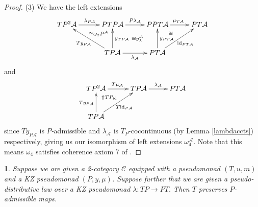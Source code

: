 \documentclass[a4paper,oneside,english]{amsart}
\numberwithin{equation}{section}
\numberwithin{figure}{section}
\theoremstyle{plain}
\theoremstyle{definition}
\theoremstyle{remark}
\theoremstyle{definition}
\theoremstyle{plain}
\newtheorem{prop}[thm]{\protect\propositionname}
\theoremstyle{plain}
\theoremstyle{plain}
\providecommand{\propositionname}{Proposition}
\begin{document}
\begin{proof}
(3) We have the left extensions
\[
\xymatrix@=1em{TP^{2}\mathcal{A}\ar[rr]^{\lambda_{P\mathcal{A}}} &  & PTP\mathcal{A}\ar[rr]^{P\lambda_{\mathcal{A}}}\ar@{}[rddr]|-{\quad\cong y_{\lambda}^{\mathcal{A}}} &  & PPT\mathcal{A}\ar[rr]^{\mu_{T\mathcal{A}}} &  & PT\mathcal{A}\\
 & \;\ar@{}[ur]|-{\cong\omega_{2}P^{\mathcal{A}}} &  &  &  & \ar@{}[ul]|-{\cong}\\
 &  & TP\mathcal{A}\ar[uu]_{y_{TP\mathcal{A}}}\ar[uull]^{Ty_{P\mathcal{A}}}\ar[rr]_{\lambda_{\mathcal{A}}} &  & PT\mathcal{A}\ar[uu]_{y_{PT\mathcal{A}}}\ar[rruu]_{\textnormal{id}_{PT\mathcal{A}}}
}
\]
and
\[
\xymatrix@=1em{TP^{2}\mathcal{A}\ar[rr]^{T\mu_{\mathcal{A}}} &  & TP\mathcal{A}\ar[rr]^{\lambda_{\mathcal{A}}} &  & PT\mathcal{A}\\
 & \;\ar@{}[ul]|-{\Uparrow TP_{\textnormal{id}}}\\
TP\mathcal{A}\ar[rruu]_{T\textnormal{id}_{P\mathcal{A}}}\ar[uu]^{Ty_{P\mathcal{A}}}
}
\]
since $Ty_{P\mathcal{A}}$ is \emph{$P$-}admissible and $\lambda_{\mathcal{A}}$
is $T_{P}$-cocontinuous (by Lemma \ref{lambdaccts}) respectively,
giving us our isomorphism of left extensions $\omega_{4}^{\mathcal{A}}$.
Note that this means $\omega_{4}$ satisfies coherence axiom 7 of
\cite{marm1999}.\end{proof}
\begin{prop}
\label{preserveadm} Suppose we are given a 2-category $\mathscr{C}$
equipped with a pseudomonad $\left(T,u,m\right)$ and a KZ pseudomonad
$\left(P,y,\mu\right)$. Suppose further that we are given a pseudo-distributive
law over a KZ pseudomonad $\lambda\colon TP\to PT$. Then $T$ preserves
$P$-admissible maps.\end{prop}
\end{document}
